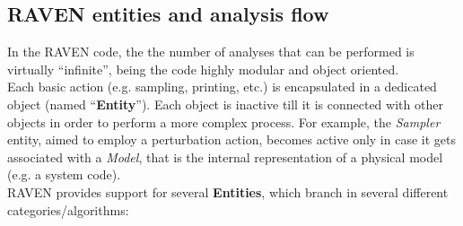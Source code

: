 \subsection{RAVEN entities and analysis flow}
\label{sub:EntitiesAndFlow}
In the RAVEN code, the the number of analyses that can be performed is virtually ``infinite'',
being the code highly modular and object oriented. 
\\Each basic action (e.g. sampling, printing, etc.) is encapsulated in
a dedicated object (named ``\textbf{Entity}''). Each object is inactive till it is connected with 
other objects in order to perform a more complex process. For example,
the \textit{Sampler} entity, aimed to employ a perturbation action, becomes active only in case
it gets associated with a \textit{Model}, that is the internal representation of a physical model (e.g. a system code).
\\RAVEN provides support for several \textbf{Entities}, which branch in several different categories/algorithms:
